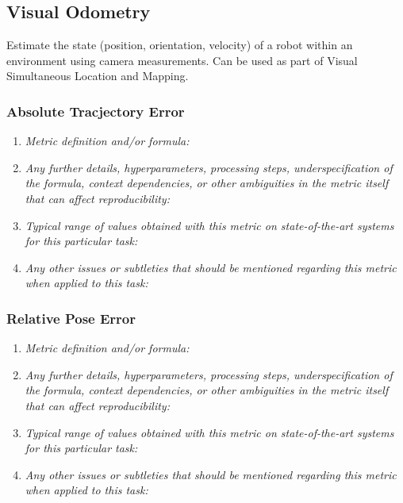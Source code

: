 \documentclass[a4paper,11pt]{article}
\begin{document}
    \subsection{Visual Odometry}
        Estimate the state (position, orientation, velocity) of a robot within an environment using camera measurements. Can be used as part of Visual Simultaneous Location and Mapping. 
        \subsubsection{Absolute Tracjectory Error}
            \begin{enumerate}[label=\alph*.]
                \item \textit{Metric definition and/or formula:}
                \bigskip
                \item \textit{Any further details, hyperparameters, processing steps, underspecification of the formula, context dependencies, or other ambiguities in the metric itself that can affect reproducibility:}
                \bigskip
                \item \textit{Typical range of values obtained with this metric on state-of-the-art systems for this particular task:}
                \bigskip
                \item \textit{Any other issues or subtleties that should be mentioned regarding this metric when applied to this task:}
                \bigskip
            \end{enumerate}
        \subsubsection{Relative Pose Error}
            \begin{enumerate}[label=\alph*.]
                \item \textit{Metric definition and/or formula:}
                \bigskip
                \item \textit{Any further details, hyperparameters, processing steps, underspecification of the formula, context dependencies, or other ambiguities in the metric itself that can affect reproducibility:}
                \bigskip
                \item \textit{Typical range of values obtained with this metric on state-of-the-art systems for this particular task:}
                \bigskip
                \item \textit{Any other issues or subtleties that should be mentioned regarding this metric when applied to this task:}
                \bigskip
            \end{enumerate}
\end{document}
